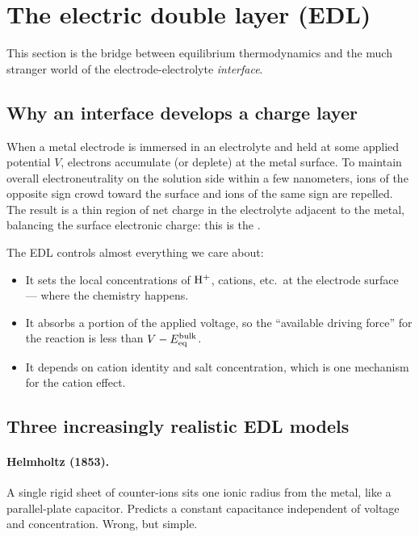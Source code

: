 \documentclass[11pt]{article}
\begin{document}
\section{The electric double layer (EDL)}

This section is the bridge between equilibrium thermodynamics and
the much stranger world of the electrode-electrolyte
\textit{interface}.

\subsection{Why an interface develops a charge layer}

When a metal electrode is immersed in an electrolyte and held at
some applied potential $V$, electrons accumulate (or deplete) at the
metal surface. To maintain overall electroneutrality on the
solution side within a few nanometers, ions of the opposite sign
crowd toward the surface and ions of the same sign are repelled.
The result is a thin region of net charge in the electrolyte adjacent
to the metal, balancing the surface electronic charge: this is the
.

The EDL controls almost everything we care about:
\begin{itemize}[leftmargin=*]
\item It sets the local concentrations of $\mathrm{H^+}$, cations, etc.\ at
      the electrode surface --- where the chemistry happens.
\item It absorbs a portion of the applied voltage, so the
      ``available driving force'' for the reaction is less than
      $V - E_{\mathrm{eq}}^{\mathrm{bulk}}$.
\item It depends on cation identity and salt concentration, which is
      one mechanism for the cation effect.
\end{itemize}

\subsection{Three increasingly realistic EDL models}

\paragraph{Helmholtz (1853).}
A single rigid sheet of counter-ions sits one ionic radius from the
metal, like a parallel-plate capacitor. Predicts a constant
capacitance independent of voltage and concentration. Wrong, but
simple.
\end{document}
